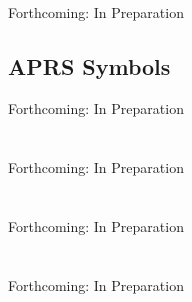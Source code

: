 \documentclass{report}
\begin{document}
\chapter{}
Forthcoming: In Preparation

% 
\chapter{APRS Symbols}
Forthcoming: In Preparation

%
\part{}
Forthcoming: In Preparation

%
\part{}
Forthcoming: In Preparation

%
\part{}
Forthcoming: In Preparation
\end{document}
